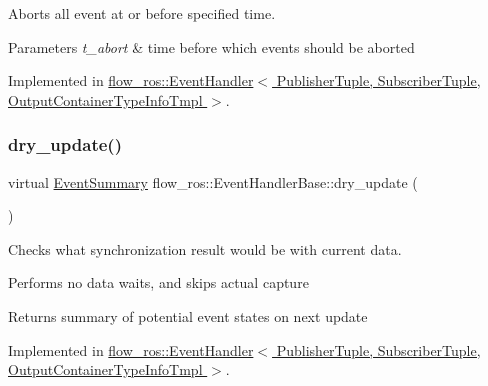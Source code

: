 Aborts all event at or before specified time. 


\begin{DoxyParams}{Parameters}
{\em t\+\_\+abort} & time before which events should be aborted \\
\hline
\end{DoxyParams}


Implemented in \hyperlink{classflow__ros_1_1_event_handler_a95200a36fc64725ac280c04c2697f709}{flow\+\_\+ros\+::\+Event\+Handler$<$ Publisher\+Tuple, Subscriber\+Tuple, Output\+Container\+Type\+Info\+Tmpl $>$}.

\mbox{\label{classflow__ros_1_1_event_handler_base_a85873d1e3eaa3c152295c5c49d5948f6}} 
\subsubsection{\texorpdfstring{dry\+\_\+update()}{dry\_update()}}
{\footnotesize\ttfamily virtual \hyperlink{structflow__ros_1_1_event_summary}{Event\+Summary} flow\+\_\+ros\+::\+Event\+Handler\+Base\+::dry\+\_\+update (\begin{DoxyParamCaption}{ }\end{DoxyParamCaption})\hspace{0.3cm}{\ttfamily [pure virtual]}}



Checks what synchronization result would be with current data. 

Performs no data waits, and skips actual capture

\begin{DoxyReturn}{Returns}
summary of potential event states on next {\ttfamily update} 
\end{DoxyReturn}


Implemented in \hyperlink{classflow__ros_1_1_event_handler_abc2f1821d85ab05d86270cbf20da6cd9}{flow\+\_\+ros\+::\+Event\+Handler$<$ Publisher\+Tuple, Subscriber\+Tuple, Output\+Container\+Type\+Info\+Tmpl $>$}.

\mbox{\label{classflow__ros_1_1_event_handler_base_a1e476ba767ddceda60aadc5655ef33ed}} 
